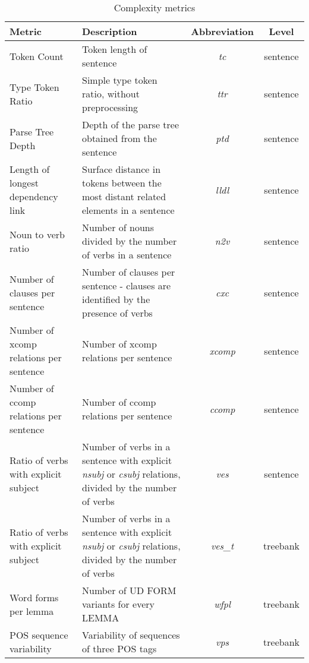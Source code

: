 \begin{table*}[ht]
    \centering
    \begin{tabular}{p{100px}p{150px}cc}
        \hline
        \textbf{Metric} & \textbf{Description} & \textbf{Abbreviation} & \textbf{Level} \\
        \hline
        Token Count & Token length of sentence & \emph{tc} & sentence \\
        \hline
        Type Token Ratio & Simple type token ratio, without preprocessing & \emph{ttr} & sentence \\
        \hline
        Parse Tree Depth & Depth of the parse tree obtained from the sentence & \emph{ptd} & sentence \\
        \hline
        Length of longest dependency link & Surface distance in tokens between the most distant related elements in a sentence & \emph{lldl} & sentence \\
        \hline
        Noun to verb ratio & Number of nouns divided by the number of verbs in a sentence & \emph{n2v} & sentence \\
        \hline
        Number of clauses per sentence & Number of clauses per sentence - clauses are identified by the presence of verbs & \emph{cxc} & sentence \\
        \hline
        Number of xcomp relations per sentence & Number of xcomp relations per sentence & \emph{xcomp} & sentence \\
        \hline
        Number of ccomp relations per sentence & Number of ccomp relations per sentence & \emph{ccomp} & sentence \\
        \hline
        Ratio of verbs with explicit subject & Number of verbs in a sentence with explicit \emph{nsubj} or \emph{csubj} relations, divided by the number of verbs & \emph{ves} & sentence \\
        \hline
        Ratio of verbs with explicit subject & Number of verbs in a sentence with explicit \emph{nsubj} or \emph{csubj} relations, divided by the number of verbs & \emph{ves\_t} & treebank \\
        \hline
        Word forms per lemma & Number of UD FORM variants for every LEMMA & \emph{wfpl} & treebank \\
        \hline
        POS sequence variability & Variability of sequences of three POS tags & \emph{vps} & treebank \\
        \hline
    \end{tabular}
    \caption{Complexity metrics}
    \label{tab:metrics}
\end{table*}